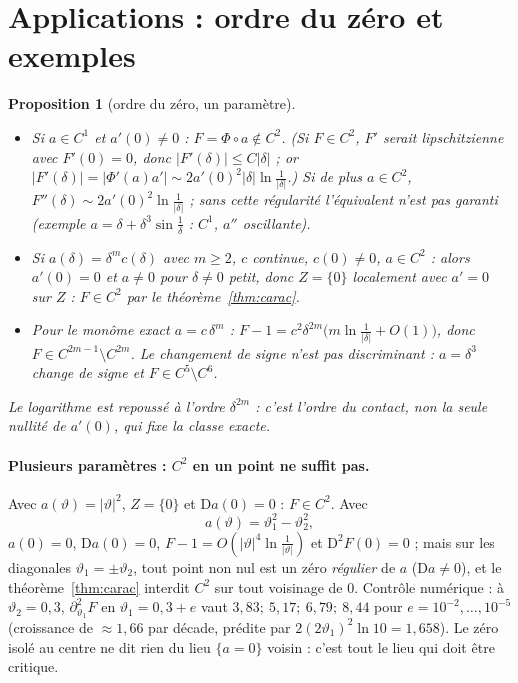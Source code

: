 \documentclass[11pt,a4paper]{article}
\newtheorem{proposition}[theoreme]{Proposition}
\theoremstyle{remark}
\newcommand{\vth}{\vartheta}
\newcommand{\D}{\mathrm D}
\begin{document}
\section{Applications : ordre du zéro et exemples}
\begin{proposition}[ordre du zéro, un paramètre]\label{prop:ordre}
\begin{itemize}[nosep]
\item Si $a\in C^1$ et $a'(0)\ne0$ : $F=\Phi\circ a\notin C^2$. (Si $F\in C^2$, $F'$ serait lipschitzienne avec $F'(0)=0$, donc $\lvert F'(\delta)\rvert\le C\lvert\delta\rvert$ ; or $\lvert F'(\delta)\rvert=\lvert\Phi'(a)a'\rvert\sim2a'(0)^2\lvert\delta\rvert\ln\frac1{\lvert\delta\rvert}$.) Si de plus $a\in C^2$, $F''(\delta)\sim2a'(0)^2\ln\frac1{\lvert\delta\rvert}$ ; sans cette régularité l'équivalent n'est pas garanti (exemple $a=\delta+\delta^3\sin\frac1\delta$ : $C^1$, $a''$ oscillante).
\item Si $a(\delta)=\delta^mc(\delta)$ avec $m\ge2$, $c$ continue, $c(0)\ne0$, $a\in C^2$ : alors $a'(0)=0$ et $a\ne0$ pour $\delta\ne0$ petit, donc $Z=\{0\}$ localement avec $a'=0$ sur $Z$ : $F\in C^2$ par le théorème~\ref{thm:carac}.
\item Pour le monôme exact $a=c\,\delta^m$ : $F-1=c^2\delta^{2m}\bigl(m\ln\frac1{\lvert\delta\rvert}+O(1)\bigr)$, donc $F\in C^{2m-1}\setminus C^{2m}$. Le changement de signe n'est pas discriminant : $a=\delta^3$ change de signe et $F\in C^5\setminus C^6$.
\end{itemize}
Le logarithme est repoussé à l'ordre $\delta^{2m}$ : c'est l'ordre du contact, non la seule nullité de $a'(0)$, qui fixe la classe exacte.
\end{proposition}

\paragraph{Plusieurs paramètres : $C^2$ en un point ne suffit pas.} Avec $a(\vth)=\lvert\vth\rvert^2$, $Z=\{0\}$ et $\D a(0)=0$ : $F\in C^2$. Avec
\[
a(\vth)=\vth_1^2-\vth_2^2,
\]
$a(0)=0$, $\D a(0)=0$, $F-1=O(\lvert\vth\rvert^4\ln\frac1{\lvert\vth\rvert})$ et $\D^2F(0)=0$ ; mais sur les diagonales $\vth_1=\pm\vth_2$, tout point non nul est un zéro \emph{régulier} de $a$ ($\D a\ne0$), et le théorème~\ref{thm:carac} interdit $C^2$ sur tout voisinage de $0$. Contrôle numérique : à $\vth_2=0{,}3$, $\partial^2_{\vth_1}F$ en $\vth_1=0{,}3+e$ vaut $3{,}83;\ 5{,}17;\ 6{,}79;\ 8{,}44$ pour $e=10^{-2},\dots,10^{-5}$ (croissance de $\approx1{,}66$ par décade, prédite par $2(2\vth_1)^2\ln10=1{,}658$). Le zéro isolé au centre ne dit rien du lieu $\{a=0\}$ voisin : c'est tout le lieu qui doit être critique.
\end{document}
